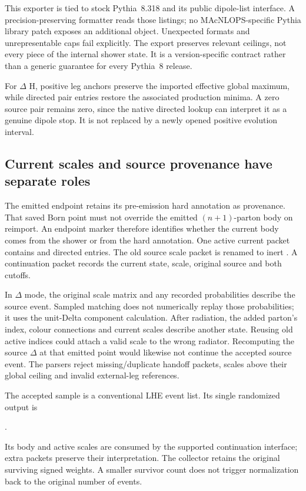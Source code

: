 This exporter is tied to stock Pythia~8.318 and its public
dipole-list interface.
A precision-preserving formatter reads those listings; no
MAcNLOPS-specific Pythia library patch exposes an additional object.
Unexpected formats and unrepresentable caps fail explicitly.
The export preserves relevant ceilings, not every piece of the
internal shower state.
It is a version-specific contract rather than a generic guarantee
for every Pythia~8 release.

For $\Delta$ H, positive leg anchors preserve the imported effective
global maximum, while directed pair entries restore the associated
production minima.
A zero source pair remains zero, since the native directed lookup
can interpret it as a genuine dipole stop.
It is not replaced by a newly opened positive evolution interval.

\subsection{Current scales and source provenance have separate roles}
\label{sec:masses-current-packets}

The emitted endpoint retains its pre-emission hard annotation as
provenance. That saved Born point must not override the emitted
$(n+1)$-parton body on reimport.
An endpoint marker therefore identifies whether the current body
comes from the shower or from the hard annotation.
One active current  packet contains
 and directed  entries.
The old source scale packet is renamed to inert
.
A continuation packet records the current state, scale, original
source  and both cutoffs.

In $\Delta$ mode, the original scale matrix and any recorded probabilities
describe the source event. Sampled matching does not numerically replay
those probabilities; it uses the unit-Delta component calculation.
After radiation, the added parton's index, colour connections and
current scales describe another state.
Reusing old active indices could attach a valid scale to the wrong
radiator. Recomputing the source $\Delta$ at that emitted point
would likewise not continue the accepted source event.
The parsers reject missing/duplicate handoff packets, scales above
their global ceiling and invalid external-leg references.

The accepted sample is a conventional LHE event list.
Its single randomized output is
\begin{center}
.
\end{center} Its body and active scales are consumed by the supported
continuation interface; extra packets preserve their interpretation.
The collector retains the original surviving signed weights.
A smaller survivor count does not trigger normalization back
to the original number of events.

